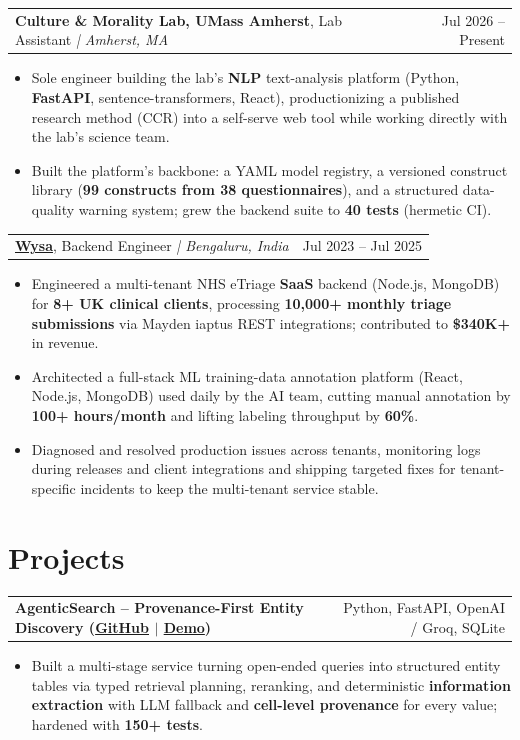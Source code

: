 \documentclass[letterpaper,11pt]{article}
\makeatletter
\newcommand{\expItem}[4]{%
  \vspace{2pt}
  \begin{tabular*}{\textwidth}{@{}l@{\extracolsep{\fill}}r@{}}
    \textbf{#1}, #2 \textit{| #3} & #4 \\
  \end{tabular*}\par\vspace{-3pt}
}
\newcommand{\projItem}[2]{%
  \vspace{2pt}
  \begin{tabular*}{\textwidth}{@{}l@{\extracolsep{\fill}}r@{}}
    \textbf{#1} & #2 \\
  \end{tabular*}\par\vspace{-3pt}
}
\makeatother
\begin{document}
\expItem{Culture \& Morality Lab, UMass Amherst}{Lab Assistant}{Amherst, MA}{Jul 2026 -- Present}
\begin{itemize}
  \item Sole engineer building the lab's \textbf{NLP} text-analysis platform (Python, \textbf{FastAPI}, sentence-transformers, React), productionizing a published research method (CCR) into a self-serve web tool while working directly with the lab's science team.
  \item Built the platform's backbone: a YAML model registry, a versioned construct library (\textbf{99 constructs from 38 questionnaires}), and a structured data-quality warning system; grew the backend suite to \textbf{40 tests} (hermetic CI).
\end{itemize}

\expItem{\href{https://www.wysa.io}{Wysa}}{Backend Engineer}{Bengaluru, India}{Jul 2023 -- Jul 2025}
\begin{itemize}
  \item Engineered a multi-tenant NHS eTriage \textbf{SaaS} backend (Node.js, MongoDB) for \textbf{8+ UK clinical clients}, processing \textbf{10{,}000+ monthly triage submissions} via Mayden iaptus REST integrations; contributed to \textbf{\$340K+} in revenue.
  \item Architected a full-stack ML training-data annotation platform (React, Node.js, MongoDB) used daily by the AI team, cutting manual annotation by \textbf{100+ hours/month} and lifting labeling throughput by \textbf{60\%}.
  \item Diagnosed and resolved production issues across tenants, monitoring logs during releases and client integrations and shipping targeted fixes for tenant-specific incidents to keep the multi-tenant service stable.
\end{itemize}

\section{Projects}

\projItem{AgenticSearch -- Provenance-First Entity Discovery {\normalfont\small(\href{https://github.com/Deva-1903/ciir_agentic_search}{GitHub} $\vert$ \href{https://agentic-search-negglszkwa-uc.a.run.app}{Demo})}}{Python, FastAPI, OpenAI / Groq, SQLite}
\begin{itemize}
  \item Built a multi-stage service turning open-ended queries into structured entity tables via typed retrieval planning, reranking, and deterministic \textbf{information extraction} with LLM fallback and \textbf{cell-level provenance} for every value; hardened with \textbf{150+ tests}.
\end{itemize}
\end{document}

